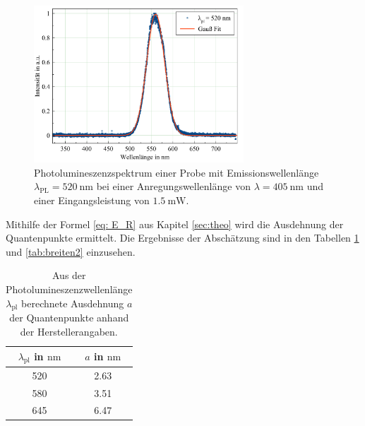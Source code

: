 \begin{figure}[H]
  \centering
  \includegraphics[width=0.7\textwidth]{plots/PL_520nm.png}
  \caption{Photolumineszenzspektrum einer Probe mit Emissionswellenlänge $\lambda_{\text{PL}}=\SI{520}{\nano\meter}$ bei einer Anregungswellenlänge von $\lambda=\SI{405}{\nano\meter}$ und einer Eingangsleistung von $\SI{1,5}{\milli\watt}$.}
  \label{fig:pl520}
\end{figure}

Mithilfe der Formel \ref{eq: E_R} aus Kapitel \ref{sec:theo} wird die Ausdehnung der Quantenpunkte ermittelt. Die Ergebnisse der Abschätzung sind in den Tabellen \ref{tab:breiten} und \ref{tab:breiten2} einzusehen.
\begin{table}[H]
  \centering
  \caption{Aus der Photolumineszenzwellenlänge $\lambda_{\text{pl}}$ berechnete Ausdehnung $a$ der Quantenpunkte anhand der Herstellerangaben.}
  \label{tab:breiten}
  \begin{tabular}{cc}
    \toprule
     $\lambda_{\text{pl}}$ in $\si{\nano\meter}$& $a$ in $\si{\nano\meter}$ \\
    \midrule
    520 & 2.63 \\
    580 & 3.51 \\
    645 & 6.47 \\
    \bottomrule
  \end{tabular}
\end{table}

